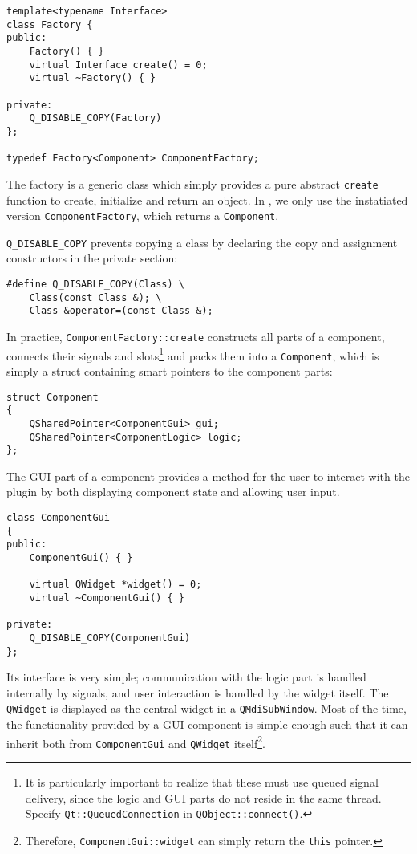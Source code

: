 \begin{lstlisting}
template<typename Interface>
class Factory {
public:
    Factory() { }
    virtual Interface create() = 0;
    virtual ~Factory() { }

private:
    Q_DISABLE_COPY(Factory)
};

typedef Factory<Component> ComponentFactory;
\end{lstlisting}

The factory is a generic class which simply provides a pure abstract \lstinline|create| function
to create, initialize and return an object. In \qsimavr, we only use the instatiated
version \lstinline|ComponentFactory|, which returns a \lstinline|Component|.

\lstinline|Q_DISABLE_COPY| prevents copying a class by declaring the copy and
assignment constructors in the private section:

\begin{lstlisting}
#define Q_DISABLE_COPY(Class) \
    Class(const Class &); \
    Class &operator=(const Class &);
\end{lstlisting}

In practice, \lstinline|ComponentFactory::create| constructs all parts of a component, connects
their signals and slots\footnote{
%
It is particularly important to realize that these must use queued signal
delivery, since the logic and \ac{GUI} parts do not reside in the same thread.
Specify \lstinline|Qt::QueuedConnection| in \lstinline|QObject::connect()|.
%
} and packs them into a \lstinline|Component|, which is simply a struct containing
smart pointers to the component parts:

\begin{lstlisting}
struct Component
{
    QSharedPointer<ComponentGui> gui;
    QSharedPointer<ComponentLogic> logic;
};
\end{lstlisting}

The \ac{GUI} part of a component provides a method for the user to interact with
the plugin by both displaying component state and allowing user input.

\begin{lstlisting}
class ComponentGui
{
public:
    ComponentGui() { }

    virtual QWidget *widget() = 0;
    virtual ~ComponentGui() { }

private:
    Q_DISABLE_COPY(ComponentGui)
};
\end{lstlisting}

Its interface is very simple; communication with the logic part is handled internally
by signals, and user interaction is handled by the widget itself. The
\lstinline|QWidget| is displayed as the central widget in a \lstinline|QMdiSubWindow|.
Most of the time, the functionality provided by a \ac{GUI} component is simple enough
such that it can inherit both from \lstinline|ComponentGui| and \lstinline|QWidget|
itself\footnote{
%
Therefore, \lstinline|ComponentGui::widget| can simply return the
\lstinline|this| pointer.
%
}.

